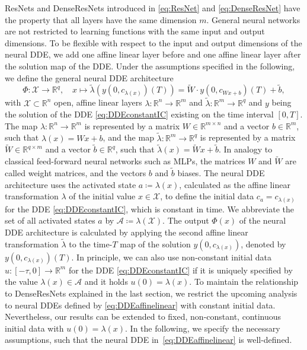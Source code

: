 \documentclass[10pt]{article}
\numberwithin{equation}{section}
\begin{document}
	ResNets and DenseResNets introduced in \eqref{eq:ResNet} and \eqref{eq:DenseResNet} have the property that all layers have the same dimension $m$. General neural networks are not restricted to learning functions with the same input and output dimensions. To be flexible with respect to the input and output dimensions of the neural DDE, we add one affine linear layer before and one affine linear layer after the solution map of the DDE. Under the assumptions specified in the following, we define the general neural DDE architecture
	\begin{equation}\label{eq:DDEaffinelinear}
		\Phi: \mathcal{X} \rightarrow \mathbb{R}^q, \quad x \mapsto \tilde{\lambda}(y(0,c_{\lambda(x)})(T)) = \widetilde{W} \cdot y(0,c_{Wx+b})(T) + \tilde{b} ,
	\end{equation}
	with $\mathcal{X}\subset \mathbb{R}^n$ open, affine linear layers $\lambda:\mathbb{R}^n\rightarrow \mathbb{R}^m$ and $\tilde \lambda:\mathbb{R}^m\rightarrow \mathbb{R}^q$ and $y$ being the solution of the DDE \eqref{eq:DDEconstantIC} existing on the time interval $[0,T]$.  The map $\lambda: \mathbb{R}^n \rightarrow \mathbb{R}^m$ is represented by a matrix $W \in \mathbb{R}^{m \times n}$ and a vector $b \in \mathbb{R}^m$, such that $\lambda(x) = Wx+b$, and the map $\widetilde{\lambda}: \mathbb{R}^m\rightarrow \mathbb{R}^q$ is represented by a matrix $\widetilde{W} \in \mathbb{R}^{q\times m}$ and a vector $\tilde{b} \in \mathbb{R}^q$, such that $\tilde\lambda(x) = \widetilde{W}x+\tilde b$. In analogy to classical feed-forward neural networks such as MLPs, the matrices $W$ and $\widetilde{W}$ are called weight matrices, and the vectors $b$ and $\tilde{b}$ biases. 
	The neural DDE architecture uses the activated state $a \coloneqq \lambda(x)$, calculated as the affine linear transformation $\lambda$ of the initial value $x\in \mathcal{X}$, to define the initial data $c_a = c_{\lambda(x)}$ for the DDE \eqref{eq:DDEconstantIC}, which is constant in time. We abbreviate the set of all activated states $a$ by $\mathcal{A}\coloneqq \lambda(\mathcal{X})$. The output $\Phi(x)$ of the neural DDE architecture is calculated by applying the second affine linear transformation $\tilde \lambda$ to the time-$T$ map of the solution $y(0,c_{\lambda(x)})$, denoted by  $y(0,c_{\lambda(x)})(T)$. In principle, we can also use non-constant initial data $u:[-\tau,0]\rightarrow \mathbb{R}^m$ for the DDE \eqref{eq:DDEconstantIC} if it is uniquely specified by the value $\lambda(x)\in\mathcal{A}$ and it holds $u(0) = \lambda(x)$. To maintain the relationship to DenseResNets explained in the last section, we restrict the upcoming analysis to neural DDEs defined by \eqref{eq:DDEaffinelinear} with constant initial data. Nevertheless, our results can be extended to fixed, non-constant, continuous initial data with $u(0) = \lambda(x)$. In the following, we specify the necessary assumptions, such that the neural DDE in~\eqref{eq:DDEaffinelinear} is well-defined.
	
\end{document}
